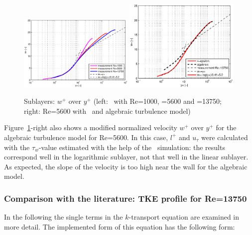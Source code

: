 \begin{figure}[!htb]
\centering
\includegraphics[trim=35 0 30 0,clip,width=0.49\textwidth]{FIGURES/wplusyplus.eps}
\includegraphics[trim=35 0 30 0,clip,width=0.49\textwidth]{FIGURES/avske.eps}
\caption{Sublayers: $w^+$ over $y^+$ (left: \ke\, with Re=1000, =5600 and =13750; right: Re=5600 with \ke\, and algebraic turbulence model)}
\label{fig:sublayers_y+}
\end{figure} 

\noindent Figure~\ref{fig:sublayers_y+}-right also shows a modified normalized velocity $w^+$ over $y^+$ for the algebraic turbulence model for Re=5600. In this case, $l^+$ and $u_{\tau}$ were calculated with the $\tau_w$-value estimated with the help of the \ke\, simulation: the results correspond well in the logarithmic sublayer, not that well in the linear sublayer. As expected, the slope of the velocity is too high near the wall for the algebraic model.


\subsubsection*{Comparison with the literature: TKE profile for Re=13750}

In the following the single terms in the $k$-transport equation are examined in more detail. The implemented form of this equation has the following form:

